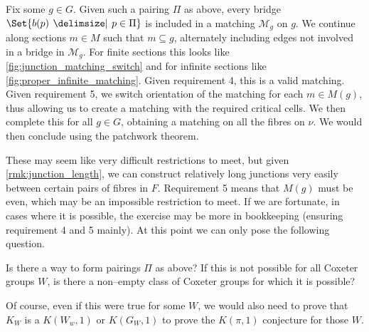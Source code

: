 \documentclass[class=article, crop=false]{standalone}
\begin{document}
Fix some $g \in G$. Given such a pairing $\Pi$ as above, every bridge $\Set{b(p) \given p \in \Pi}$ is included in a matching $\mathcal{M}_g$ on $g$. We continue along sections $m \in M$ such that $m \subseteq g$, alternately including edges not involved in a bridge in $\mathcal{M}_g$. For finite sections this looks like \cref{fig:junction_matching_switch} and for infinite sections like \cref{fig:proper_infinite_matching}. Given requirement 4, this is a valid matching. Given requirement 5, we switch orientation of the matching for each $m \in M(g)$, thus allowing us to create a matching with the required critical cells. We then complete this for all $g \in G$, obtaining a matching on all the fibres on $\nu$. We would then conclude using the patchwork theorem.

These may seem like very difficult restrictions to meet, but given \cref{rmk:junction_length}, we can construct relatively long junctions very easily between certain pairs of fibres in $F$. Requirement 5 means that $M(g)$ must be even, which may be an impossible restriction to meet. If we are fortunate, in cases where it is possible, the exercise may be more in bookkeeping (ensuring requirement 4 and 5 mainly). At this point we can only pose the following question.

\begin{question}
	Is there a way to form pairings $\Pi$ as above? If this is not possible for all Coxeter groups $W$, is there a non--empty class of Coxeter groups for which it is possible?
\end{question}

Of course, even if this were true for some $W$, we would also need to prove that $K_W$ is a $K(W_w,1)$ or $K(G_W,1)$ to prove the $K(\pi,1)$ conjecture for those $W$.
\end{document}
